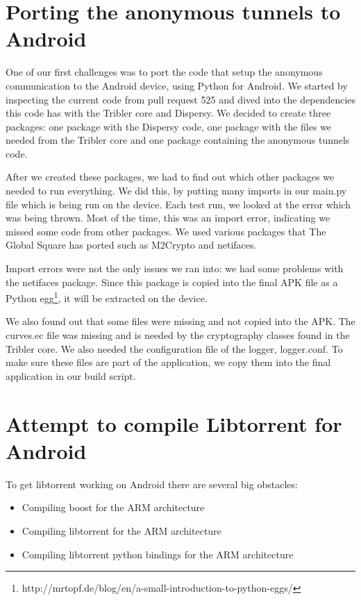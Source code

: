 	\section{Porting the anonymous tunnels to Android}
		One of our first challenges was to port the code that setup the anonymous communication to the Android device, using Python for Android. We started by inspecting the current code from pull request 525 and dived into the dependencies this code has with the Tribler core and Dispersy. We decided to create three packages: one package with the Dispersy code, one package with the files we needed from the Tribler core and one package containing the anonymous tunnels code.
		
		After we created these packages, we had to find out which other packages we needed to run everything. We did this, by putting many imports in our main.py file which is being run on the device. Each test run, we looked at the error which was being thrown. Most of the time, this was an import error, indicating we missed some code from other packages. We used various packages that The Global Square has ported such as M2Crypto and netifaces.
		
		Import errors were not the only issues we ran into: we had some problems with the netifaces package. Since this package is copied into the final APK file as a Python egg\footnote{http://mrtopf.de/blog/en/a-small-introduction-to-python-eggs/}, it will be extracted on the device.
		
		We also found out that some files were missing and not copied into the APK. The curves.ec file was missing and is needed by the cryptography classes found in the Tribler core. We also needed the configuration file of the logger, logger.conf. To make sure these files are part of the application, we copy them into the final application in our build script.
		
	\section{Attempt to compile Libtorrent for Android}
		To get libtorrent working on Android there are several big obstacles:
		\begin{itemize}
			\item Compiling boost for the ARM architecture
			\item Compiling libtorrent for the ARM architecture
			\item Compiling libtorrent python bindings for the ARM architecture
		\end{itemize}
		
